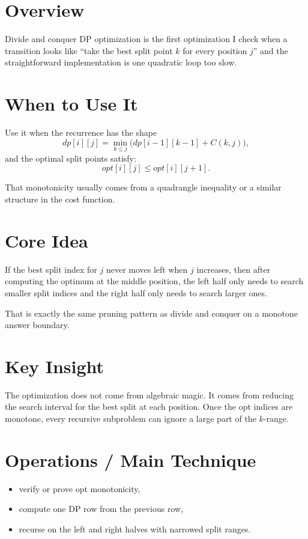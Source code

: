 \section*{Overview}

Divide and conquer DP optimization is the first optimization I check when a transition looks like ``take the best split
point \(k\) for every position \(j\)'' and the straightforward implementation is one quadratic loop too slow.

\section*{When to Use It}

Use it when the recurrence has the shape
\[
dp[i][j] = \min_{k \le j} \bigl(dp[i-1][k-1] + C(k, j)\bigr),
\]
and the optimal split points satisfy:
\[
opt[i][j] \le opt[i][j+1].
\]

That monotonicity usually comes from a quadrangle inequality or a similar structure in the cost function.

\section*{Core Idea}

If the best split index for \(j\) never moves left when \(j\) increases, then after computing the optimum at the middle
position, the left half only needs to search smaller split indices and the right half only needs to search larger ones.

That is exactly the same pruning pattern as divide and conquer on a monotone answer boundary.

\section*{Key Insight}

The optimization does not come from algebraic magic. It comes from reducing the search interval for the best split at
each position. Once the opt indices are monotone, every recursive subproblem can ignore a large part of the \(k\)-range.

\section*{Operations / Main Technique}

\begin{itemize}
  \item verify or prove opt monotonicity,
  \item compute one DP row from the previous row,
  \item recurse on the left and right halves with narrowed split ranges.
\end{itemize}

